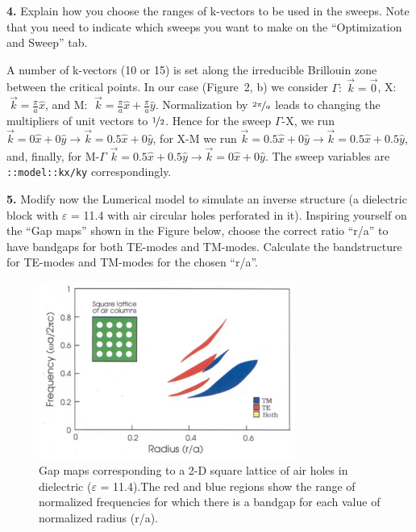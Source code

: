 \documentclass[11pt,a4paper]{article}
\begin{document}
\begin{displayquote}
    \textbf{4.} Explain how you choose the ranges of k-vectors to be used in the sweeps. Note that you need to indicate which sweeps you want to make on the “Optimization and Sweep” tab.
\end{displayquote}


A number of k-vectors (10 or 15) is set along the irreducible Brillouin zone between the critical points. In our case (Figure~2, b) we consider $\Gamma: \; \vec{k}=\Vec{0}$, X: $\; \vec{k}= \frac{\pi}{a}\hat{x} $, and M: $\; \vec{k}=\frac{\pi}{a}\hat{x}+ \frac{\pi}{a}\hat{y}$. Normalization by $\nicefrac{2 \pi}{a}$ leads to changing the multipliers of unit vectors to $\nicefrac{1}{2}$. Hence for the sweep $\Gamma$-X, we run $\vec{k}=0\hat{x}+0\hat{y} \rightarrow \vec{k}=0.5\hat{x}+0\hat{y}$, for X-M we run $\vec{k}=0.5\hat{x}+0\hat{y} \rightarrow \vec{k}=0.5\hat{x}+0.5\hat{y}$, and, finally, for M-$\Gamma$ $\vec{k}=0.5\hat{x}+0.5\hat{y} \rightarrow \vec{k}=0\hat{x}+0\hat{y}$. The sweep variables are \verb|::model::kx/ky| correspondingly.

\begin{displayquote}
    \textbf{5.} Modify now the Lumerical model to simulate an inverse structure (a dielectric block with $\varepsilon$ = 11.4 with air circular holes perforated in it).
Inspiring yourself on the “Gap maps” shown in the Figure below, choose the correct ratio “r/a” to have bandgaps for both TE-modes and TM-modes. Calculate the bandstructure for TE-modes and TM-modes for the chosen “r/a”.
\end{displayquote}

\begin{figure}[ht]
   \centering
    \includegraphics[width=0.75\textwidth]{fig3.png}
    \caption{Gap maps corresponding to a 2-D square lattice of air holes in dielectric ($\varepsilon$ = 11.4).The red and blue regions show the range of normalized frequencies for which there is a bandgap for each value of normalized radius (r/a).}
    \label{fig:fig3}
\end{figure}
\end{document}
